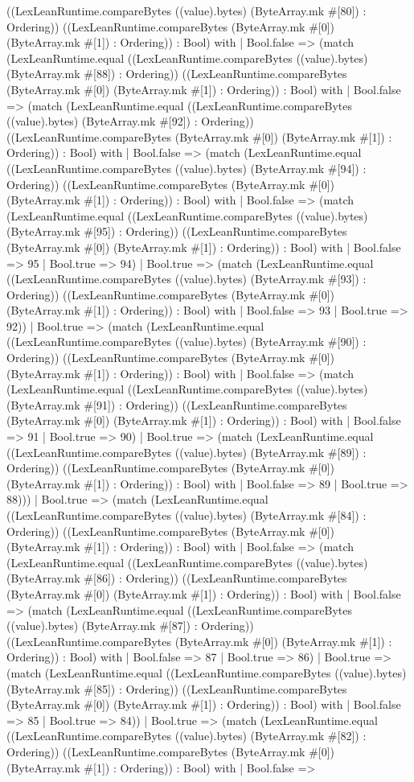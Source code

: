 \documentclass[11pt]{article}
\begin{document}
((LexLeanRuntime.compareBytes ((value).bytes) (ByteArray.mk \#[80]) : Ordering)) ((LexLeanRuntime.compareBytes (ByteArray.mk \#[0]) (ByteArray.mk \#[1]) : Ordering)) : Bool) with | Bool.false => (match (LexLeanRuntime.equal ((LexLeanRuntime.compareBytes ((value).bytes) (ByteArray.mk \#[88]) : Ordering)) ((LexLeanRuntime.compareBytes (ByteArray.mk \#[0]) (ByteArray.mk \#[1]) : Ordering)) : Bool) with | Bool.false => (match (LexLeanRuntime.equal ((LexLeanRuntime.compareBytes ((value).bytes) (ByteArray.mk \#[92]) : Ordering)) ((LexLeanRuntime.compareBytes (ByteArray.mk \#[0]) (ByteArray.mk \#[1]) : Ordering)) : Bool) with | Bool.false => (match (LexLeanRuntime.equal ((LexLeanRuntime.compareBytes ((value).bytes) (ByteArray.mk \#[94]) : Ordering)) ((LexLeanRuntime.compareBytes (ByteArray.mk \#[0]) (ByteArray.mk \#[1]) : Ordering)) : Bool) with | Bool.false => (match (LexLeanRuntime.equal ((LexLeanRuntime.compareBytes ((value).bytes) (ByteArray.mk \#[95]) : Ordering)) ((LexLeanRuntime.compareBytes (ByteArray.mk \#[0]) (ByteArray.mk \#[1]) : Ordering)) : Bool) with | Bool.false => 95 | Bool.true => 94) | Bool.true => (match (LexLeanRuntime.equal ((LexLeanRuntime.compareBytes ((value).bytes) (ByteArray.mk \#[93]) : Ordering)) ((LexLeanRuntime.compareBytes (ByteArray.mk \#[0]) (ByteArray.mk \#[1]) : Ordering)) : Bool) with | Bool.false => 93 | Bool.true => 92)) | Bool.true => (match (LexLeanRuntime.equal ((LexLeanRuntime.compareBytes ((value).bytes) (ByteArray.mk \#[90]) : Ordering)) ((LexLeanRuntime.compareBytes (ByteArray.mk \#[0]) (ByteArray.mk \#[1]) : Ordering)) : Bool) with | Bool.false => (match (LexLeanRuntime.equal ((LexLeanRuntime.compareBytes ((value).bytes) (ByteArray.mk \#[91]) : Ordering)) ((LexLeanRuntime.compareBytes (ByteArray.mk \#[0]) (ByteArray.mk \#[1]) : Ordering)) : Bool) with | Bool.false => 91 | Bool.true => 90) | Bool.true => (match (LexLeanRuntime.equal ((LexLeanRuntime.compareBytes ((value).bytes) (ByteArray.mk \#[89]) : Ordering)) ((LexLeanRuntime.compareBytes (ByteArray.mk \#[0]) (ByteArray.mk \#[1]) : Ordering)) : Bool) with | Bool.false => 89 | Bool.true => 88))) | Bool.true => (match (LexLeanRuntime.equal ((LexLeanRuntime.compareBytes ((value).bytes) (ByteArray.mk \#[84]) : Ordering)) ((LexLeanRuntime.compareBytes (ByteArray.mk \#[0]) (ByteArray.mk \#[1]) : Ordering)) : Bool) with | Bool.false => (match (LexLeanRuntime.equal ((LexLeanRuntime.compareBytes ((value).bytes) (ByteArray.mk \#[86]) : Ordering)) ((LexLeanRuntime.compareBytes (ByteArray.mk \#[0]) (ByteArray.mk \#[1]) : Ordering)) : Bool) with | Bool.false => (match (LexLeanRuntime.equal ((LexLeanRuntime.compareBytes ((value).bytes) (ByteArray.mk \#[87]) : Ordering)) ((LexLeanRuntime.compareBytes (ByteArray.mk \#[0]) (ByteArray.mk \#[1]) : Ordering)) : Bool) with | Bool.false => 87 | Bool.true => 86) | Bool.true => (match (LexLeanRuntime.equal ((LexLeanRuntime.compareBytes ((value).bytes) (ByteArray.mk \#[85]) : Ordering)) ((LexLeanRuntime.compareBytes (ByteArray.mk \#[0]) (ByteArray.mk \#[1]) : Ordering)) : Bool) with | Bool.false => 85 | Bool.true => 84)) | Bool.true => (match (LexLeanRuntime.equal ((LexLeanRuntime.compareBytes ((value).bytes) (ByteArray.mk \#[82]) : Ordering)) ((LexLeanRuntime.compareBytes (ByteArray.mk \#[0]) (ByteArray.mk \#[1]) : Ordering)) : Bool) with | Bool.false => 
\end{document}
